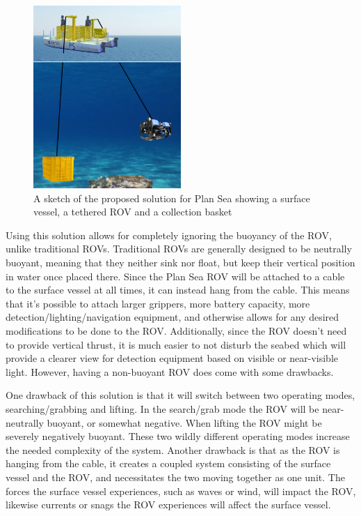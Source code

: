 \documentclass[class=article, crop=false]{standalone}
\begin{document}
\begin{figure}
	\centering
	\includegraphics[width=0.5\textwidth]{overview}
	\caption{A sketch of the proposed solution for Plan Sea showing a surface vessel, a tethered ROV and a collection basket}
	\label{fig:overview}
\end{figure}

Using this solution allows for completely ignoring the buoyancy of the ROV, unlike traditional ROVs. Traditional ROVs are generally designed to be neutrally buoyant, meaning that they neither sink nor float, but keep their vertical position in water once placed there. Since the Plan Sea ROV will be attached to a cable to the surface vessel at all times, it can instead hang from the cable. This means that it's possible to attach larger grippers, more battery capacity, more detection/lighting/navigation equipment, and otherwise allows for any desired modifications to be done to the ROV. Additionally, since the ROV doesn't need to provide vertical thrust, it is much easier to not disturb the seabed which will provide a clearer view for detection equipment based on visible or near-visible light. However, having a non-buoyant ROV does come with some drawbacks.

One drawback of this solution is that it will switch between two operating modes, searching/grabbing and lifting. In the search/grab mode the ROV will be near-neutrally buoyant, or somewhat negative. When lifting the ROV might be severely negatively buoyant. These two wildly different operating modes increase the needed complexity of the system. Another drawback is that as the ROV is hanging from the cable, it creates a coupled system consisting of the surface vessel and the ROV, and necessitates the two moving together as one unit. The forces the surface vessel experiences, such as waves or wind, will impact the ROV, likewise currents or snags the ROV experiences will affect the surface vessel.
\end{document}
